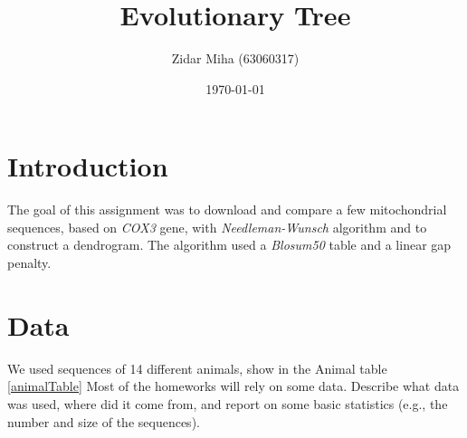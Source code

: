 \documentclass[a4paper,11pt]{article}
\title{Evolutionary Tree}
\author{Zidar Miha (63060317)}
\date{\today}
\begin{document}
\maketitle

\section{Introduction}

The goal of this assignment was to download and compare a few mitochondrial sequences, based on \textit{COX3} gene, with \textit{Needleman-Wunsch} algorithm and to construct a dendrogram. The algorithm used a \textit{Blosum50} table and a linear gap penalty.

\section{Data}

We used sequences of 14 different animals, show in the Animal table \ref{animalTable}
Most of the homeworks will rely on some data. Describe what data was used, where did it come from, and report on some basic statistics (e.g., the number and size of the sequences).
\end{document}
